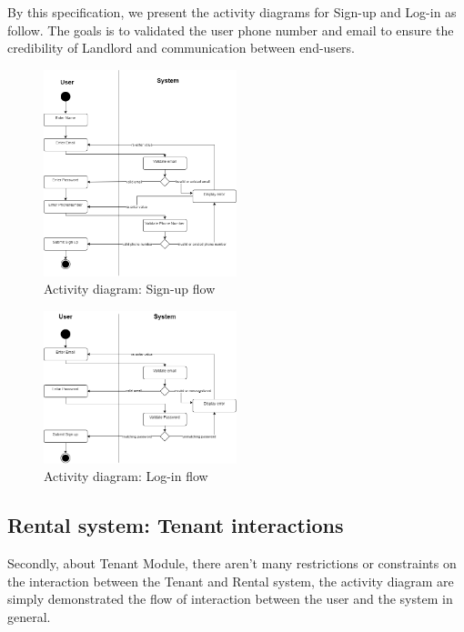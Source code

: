 \newpage
By this specification, we present the activity diagrams for Sign-up and Log-in as follow. The goals is to validated the user phone number and email to ensure the credibility of Landlord and communication between end-users.
\begin{figure}[H]
    \centering
    \includegraphics[width = 0.5\textwidth]{Images/Activity/ac_diag_signup.png}
    \caption{Activity diagram: Sign-up flow}
    \label{fig:signup-flow}
\end{figure}

\begin{figure}[H]
    \centering
    \includegraphics[width = 0.5\textwidth]{Images/Activity/ac_diag_login.png}
    \caption{Activity diagram: Log-in flow}
    \label{fig:login-flow}
\end{figure}

\newpage
\subsection{Rental system: Tenant interactions}
Secondly, about Tenant Module, there aren't many restrictions or constraints on the interaction between the Tenant and Rental system, the activity diagram are simply demonstrated the flow of interaction between the user and the system in general.


